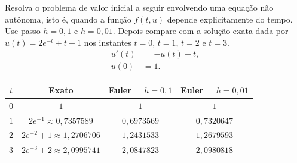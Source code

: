 \begin{exer} Resolva o problema de valor inicial a seguir envolvendo uma equação não autônoma, isto é, quando a função $f(t,u)$ depende explicitamente do tempo. Use passo $h=0,1$ e $h=0,01$. Depois compare com a solução exata dada por $u(t)=2e^{-t}+t-1$ nos instantes $t=0$, $t=1$, $t=2$ e $t=3$.
  \begin{equation}
   \begin{split}
    u'(t)&=-u(t)+t,\\
    u(0)&=1.
   \end{split}
  \end{equation}

\end{exer}
\begin{resp}
\begin{center}
  \begin{tabular}{|c|c|c|c|}\hline
    $t$ &  Exato & Euler~~ $h=0,1$ & Euler~~ $h=0,01$\\\hline
    $0$ &  $1$ & $1$ & $1$\\\hline
    $1$ &   $2e^{-1}\approx 0,7357589$ & $0,6973569$   &   $0,7320647$  \\\hline
    $2$ &   $2e^{-2}+1\approx  1,2706706$ & $ 1,2431533 $   &  $ 1,2679593$     \\\hline
    $3$ &   $2e^{-3}+2\approx 2,0995741$  & $ 2,0847823$ & $2,0980818$   \\\hline
  \end{tabular}
\end{center}
\end{resp}

